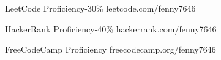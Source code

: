 
\begin{cvlangs}
  \cvlang
    {LeetCode}
    {Proficiency-30\%}
    {leetcode.com/fenny7646}
    {
    \begin{envcvlang}
    \end{envcvlang}
    }
  \cvlang
    {HackerRank}
    {Proficiency-40\%}
    {hackerrank.com/fenny7646}
    {
    \begin{envcvlang}
    \end{envcvlang}
    }
  \cvlang
    {FreeCodeCamp}
    {Proficiency}
    {freecodecamp.org/fenny7646}
    {
    \begin{envcvlang}
    \end{envcvlang}
    }
\end{cvlangs}